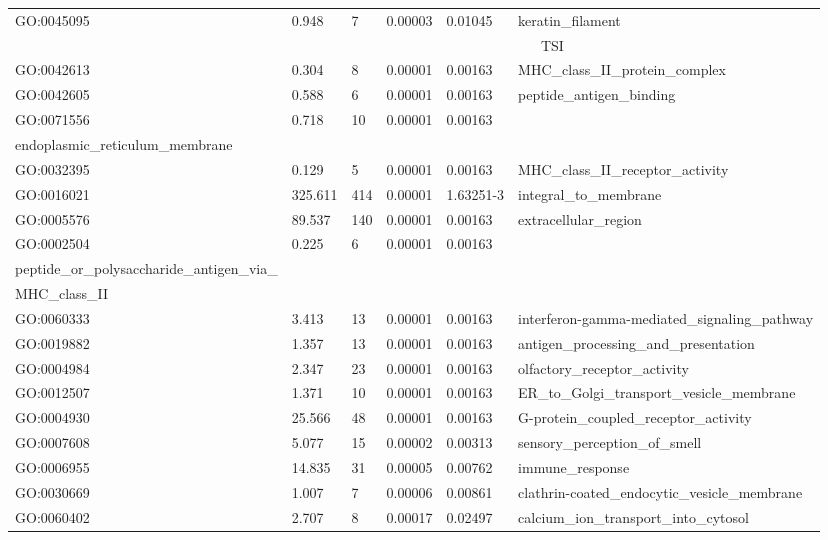 \begin{refsection}
\begin{otherlanguage}{english}
\begin{scriptsize}
\begin{longtable}{llllll}
GO:0045095 & 0.948 & 7 & 0.00003 & 0.01045 & keratin\_filament \\ 
 & \multicolumn{5}{c}{\cellcolor[HTML]{EFEFEF}TSI} \\
GO:0042613 & 0.304 & 8 & 0.00001 & 0.00163 & MHC\_class\_II\_protein\_complex \\
GO:0042605 & 0.588 & 6 & 0.00001 & 0.00163 & peptide\_antigen\_binding \\
GO:0071556 & 0.718 & 10 & 0.00001 & 0.00163 & \begin{tabular}[c]{@{}l@{}}integral\_to\_lumenal\_side\_of\_ \\ endoplasmic\_reticulum\_membrane\end{tabular} \\
GO:0032395 & 0.129 & 5 & 0.00001 & 0.00163 & MHC\_class\_II\_receptor\_activity \\
GO:0016021 & 325.611 & 414 & 0.00001 & 1.63251-3 & integral\_to\_membrane \\
GO:0005576 & 89.537 & 140 & 0.00001 & 0.00163 & extracellular\_region \\
GO:0002504 & 0.225 & 6 & 0.00001 & 0.00163 & \begin{tabular}[c]{@{}l@{}}antigen\_processing\_and\_presentation\_of\_ \\ peptide\_or\_polysaccharide\_antigen\_via\_ \\ MHC\_class\_II\end{tabular} \\
GO:0060333 & 3.413 & 13 & 0.00001 & 0.00163 & interferon-gamma-mediated\_signaling\_pathway \\
GO:0019882 & 1.357 & 13 & 0.00001 & 0.00163 & antigen\_processing\_and\_presentation \\
GO:0004984 & 2.347 & 23 & 0.00001 & 0.00163 & olfactory\_receptor\_activity \\
GO:0012507 & 1.371 & 10 & 0.00001 & 0.00163 & ER\_to\_Golgi\_transport\_vesicle\_membrane \\
GO:0004930 & 25.566 & 48 & 0.00001 & 0.00163 & G-protein\_coupled\_receptor\_activity \\
GO:0007608 & 5.077 & 15 & 0.00002 & 0.00313 & sensory\_perception\_of\_smell \\
GO:0006955 & 14.835 & 31 & 0.00005 & 0.00762 & immune\_response \\
GO:0030669 & 1.007 & 7 & 0.00006 & 0.00861 & clathrin-coated\_endocytic\_vesicle\_membrane  \\
GO:0060402 & 2.707 & 8 & 0.00017 & 0.02497 & calcium\_ion\_transport\_into\_cytosol \\ 

\end{longtable}
\end{scriptsize}
\end{otherlanguage}
\end{refsection}
